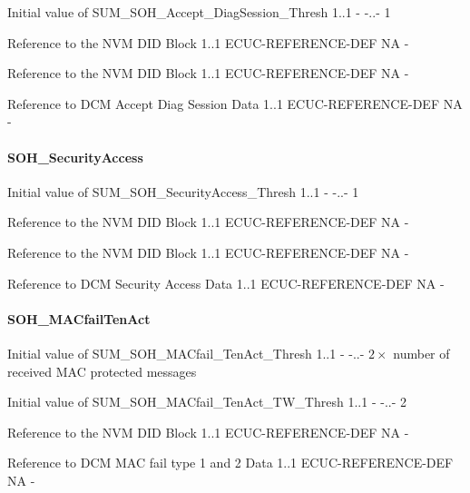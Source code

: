 {
{Initial value of SUM_SOH_Accept_DiagSession_Thresh}
{1..1}
{-}
{-..-}
{1}}

{
{Reference to the NVM DID Block}
{1..1}
{ECUC-REFERENCE-DEF}
{NA}
{-}}

{
{Reference to the NVM DID Block}
{1..1}
{ECUC-REFERENCE-DEF}
{NA}
{-}}

{
{Reference to DCM Accept Diag Session Data}
{1..1}
{ECUC-REFERENCE-DEF}
{NA}
{-}}

\paragraph{SOH_SecurityAccess}

{
{Initial value of SUM_SOH_SecurityAccess_Thresh}
{1..1}
{-}
{-..-}
{1}}

{
{Reference to the NVM DID Block}
{1..1}
{ECUC-REFERENCE-DEF}
{NA}
{-}}

{
{Reference to the NVM DID Block}
{1..1}
{ECUC-REFERENCE-DEF}
{NA}
{-}}

{
{Reference to DCM Security Access Data}
{1..1}
{ECUC-REFERENCE-DEF}
{NA}
{-}}

\paragraph{SOH_MACfailTenAct}

{
{Initial value of SUM_SOH_MACfail_TenAct_Thresh}
{1..1}
{-}
{-..-}
{$2\times$ number of received MAC protected messages}}

{
{Initial value of SUM_SOH_MACfail_TenAct_TW_Thresh}
{1..1}
{-}
{-..-}
{2}}

{
{Reference to the NVM DID Block}
{1..1}
{ECUC-REFERENCE-DEF}
{NA}
{-}}

{
{Reference to DCM MAC fail type 1 and 2 Data}
{1..1}
{ECUC-REFERENCE-DEF}
{NA}
{-}}

